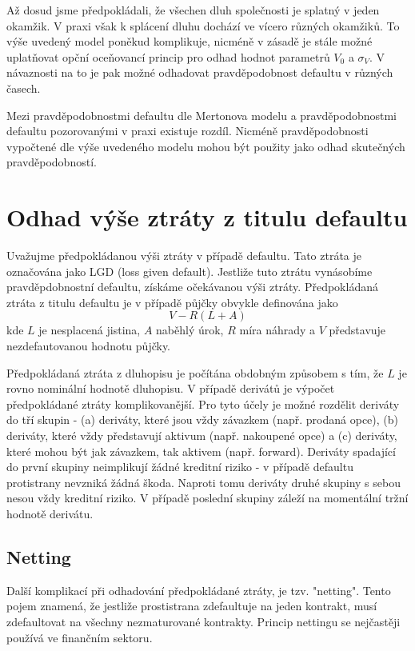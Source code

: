 \documentclass[a4paper]{book}
\begin{document}
Až dosud jsme předpokládali, že všechen dluh společnosti je splatný v jeden okamžik. V praxi však k splácení dluhu dochází ve vícero různých okamžiků. To výše uvedený model poněkud komplikuje, nicméně v zásadě je stále možné uplatňovat opční oceňovancí princip pro odhad hodnot parametrů $V_0$ a $\sigma_V$. V návaznosti na to je pak možné odhadovat pravděpodobnost defaultu v různých časech.

Mezi pravděpodobnostmi defaultu dle Mertonova modelu a pravděpodobnostmi defaultu pozorovanými v praxi existuje rozdíl. Nicméně pravděpodobnosti vypočtené dle výše uvedeného modelu mohou být použity jako odhad skutečných pravděpodobností.

\section{Odhad výše ztráty z titulu defaultu}

Uvažujme předpokládanou výši ztráty v případě defaultu. Tato ztráta je označována jako LGD (loss given default). Jestliže tuto ztrátu vynásobíme pravděpdobnostní defaultu, získáme očekávanou výši ztráty. Předpokládaná ztráta z titulu defaultu je v případě půjčky obvykle definována jako
\begin{equation*}
V - R(L + A)
\end{equation*}
kde $L$ je nesplacená jistina, $A$ naběhlý úrok, $R$ míra náhrady a $V$ představuje nezdefautovanou hodnotu půjčky.

Předpokládaná ztráta z dluhopisu je počítána obdobným způsobem s tím, že $L$ je rovno nominální hodnotě dluhopisu. V případě derivátů je výpočet předpokládané ztráty komplikovanější. Pro tyto účely je možné rozdělit deriváty do tří skupin - (a) deriváty, které jsou vždy závazkem (např. prodaná opce), (b) deriváty, které vždy představují aktivum (např. nakoupené opce) a (c) deriváty, které mohou být jak závazkem, tak aktivem (např. forward). Deriváty spadající do první skupiny neimplikují žádné kreditní riziko - v případě defaultu protistrany nevzniká žádná škoda. Naproti tomu deriváty druhé skupiny s sebou nesou vždy kreditní riziko. V případě poslední skupiny záleží na momentální tržní hodnotě derivátu.

\subsection{Netting}

Další komplikací při odhadování předpokládané ztráty, je tzv. "netting". Tento pojem znamená, že jestliže prostistrana zdefaultuje na jeden kontrakt, musí zdefaultovat na všechny nezmaturované kontrakty. Princip nettingu se nejčastěji používá ve finančním sektoru.
\end{document}
